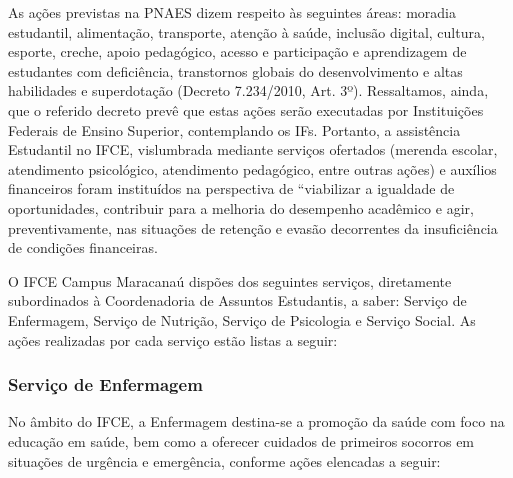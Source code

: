 \documentclass{paper}
\begin{document}
As ações previstas na PNAES dizem respeito às seguintes áreas: moradia estudantil, alimentação, transporte, atenção à saúde, inclusão digital, cultura, esporte, creche, apoio pedagógico, acesso e participação e aprendizagem de estudantes com deficiência, transtornos globais do desenvolvimento e altas habilidades e superdotação (Decreto 7.234/2010, Art. 3º). Ressaltamos, ainda, que o referido decreto prevê que estas ações serão executadas por Instituições Federais de Ensino Superior, contemplando os IFs. 
Portanto, a assistência Estudantil no IFCE, vislumbrada mediante serviços ofertados (merenda escolar, atendimento psicológico, atendimento pedagógico, entre outras ações) e auxílios financeiros foram instituídos na perspectiva de “viabilizar a igualdade de oportunidades, contribuir para a melhoria do desempenho acadêmico e agir, preventivamente, nas situações de retenção e evasão decorrentes da insuficiência de condições financeiras.
  
O IFCE Campus Maracanaú dispões dos seguintes serviços, diretamente subordinados à Coordenadoria de Assuntos Estudantis, a saber: Serviço de Enfermagem, Serviço de Nutrição, Serviço de Psicologia e Serviço Social. As ações realizadas por cada serviço estão listas a seguir:

\subsubsection{Serviço de Enfermagem} 

No âmbito do IFCE, a Enfermagem destina-se a promoção da saúde com foco na educação em saúde, bem como a oferecer cuidados de primeiros socorros em situações de urgência e emergência, conforme ações elencadas a seguir: 
\end{document}
